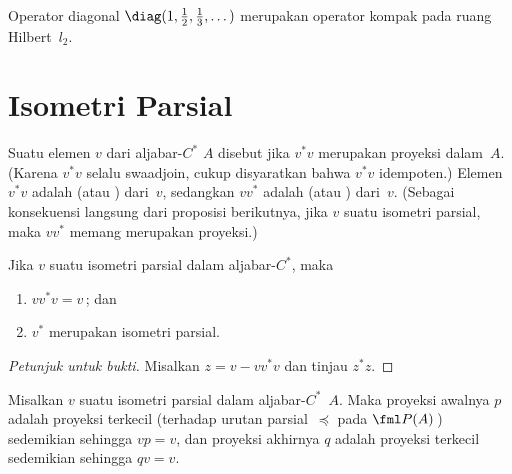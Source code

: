 \begin{exam} Operator diagonal $\diag(1,\frac12,\frac13,\dots)$ merupakan operator kompak pada ruang Hilbert~$l_2$.
\end{exam}











\section{Isometri Parsial}
\begin{defn}  Suatu elemen $v$ dari aljabar-$C^*$ $A$ disebut
 jika $v^*v$ merupakan proyeksi dalam~$A$.  (Karena $v^*v$ selalu
swaadjoin, cukup disyaratkan bahwa $v^*v$ idempoten.)  Elemen $v^*v$ adalah
 (atau
) dari~$v$, sedangkan $vv^*$ adalah 
 (atau
) dari~$v$.  (Sebagai konsekuensi langsung dari proposisi berikutnya,
jika $v$ suatu isometri parsial, maka $vv^*$ memang merupakan proyeksi.)
\end{defn}

\begin{prop}\label{pi0111} Jika $v$ suatu isometri parsial dalam aljabar-$C^*$, maka
 \begin{enumerate}[label=\rm{(\alph*)}]
  \item $vv^*v = v$\,; dan
  \item $v^*$ merupakan isometri parsial.
 \end{enumerate}
\end{prop}

\begin{proof}[\emph{Petunjuk untuk bukti}] Misalkan $z = v - vv^*v$ dan tinjau $z^*z$.  \ns
\end{proof}

\begin{prop}\label{pi0114} Misalkan $v$ suatu isometri parsial dalam aljabar-$C^*$~$A$.  Maka proyeksi awalnya
$p$ adalah proyeksi terkecil (terhadap urutan parsial~$\preceq$
pada $\fml P(A)$\,) sedemikian sehingga $vp = v$, dan proyeksi akhirnya $q$ adalah proyeksi
terkecil sedemikian sehingga $qv = v$.
\end{prop}

